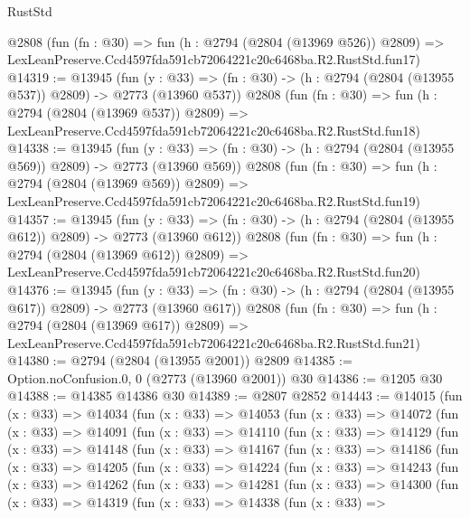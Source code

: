\begin{lexlean}{RustStd}
\begin{coremodule}
    @2808
    (fun (fn : @30) =>
    fun (h : @2794 (@2804 (@13969 @526)) @2809) =>
    LexLeanPreserve.Ccd4597fda591cb72064221c20c6468ba.R2.RustStd.fun17)
@14319 := @13945
    (fun (y : @33) => (fn : @30) -> (h : @2794 (@2804 (@13955 @537)) @2809) -> @2773 (@13960 @537))
    @2808
    (fun (fn : @30) =>
    fun (h : @2794 (@2804 (@13969 @537)) @2809) =>
    LexLeanPreserve.Ccd4597fda591cb72064221c20c6468ba.R2.RustStd.fun18)
@14338 := @13945
    (fun (y : @33) => (fn : @30) -> (h : @2794 (@2804 (@13955 @569)) @2809) -> @2773 (@13960 @569))
    @2808
    (fun (fn : @30) =>
    fun (h : @2794 (@2804 (@13969 @569)) @2809) =>
    LexLeanPreserve.Ccd4597fda591cb72064221c20c6468ba.R2.RustStd.fun19)
@14357 := @13945
    (fun (y : @33) => (fn : @30) -> (h : @2794 (@2804 (@13955 @612)) @2809) -> @2773 (@13960 @612))
    @2808
    (fun (fn : @30) =>
    fun (h : @2794 (@2804 (@13969 @612)) @2809) =>
    LexLeanPreserve.Ccd4597fda591cb72064221c20c6468ba.R2.RustStd.fun20)
@14376 := @13945
    (fun (y : @33) => (fn : @30) -> (h : @2794 (@2804 (@13955 @617)) @2809) -> @2773 (@13960 @617))
    @2808
    (fun (fn : @30) =>
    fun (h : @2794 (@2804 (@13969 @617)) @2809) =>
    LexLeanPreserve.Ccd4597fda591cb72064221c20c6468ba.R2.RustStd.fun21)
@14380 := @2794 (@2804 (@13955 @2001)) @2809
@14385 := Option.noConfusion.{0, 0} (@2773 (@13960 @2001)) @30
@14386 := @1205 @30
@14388 := @14385 @14386 @30
@14389 := @2807 @2852
@14443 := @14015
    (fun (x : @33) =>
    @14034
      (fun (x : @33) =>
      @14053
        (fun (x : @33) =>
        @14072
          (fun (x : @33) =>
          @14091
            (fun (x : @33) =>
            @14110
              (fun (x : @33) =>
              @14129
                (fun (x : @33) =>
                @14148
                  (fun (x : @33) =>
                  @14167
                    (fun (x : @33) =>
                    @14186
                      (fun (x : @33) =>
                      @14205
                        (fun (x : @33) =>
                        @14224
                          (fun (x : @33) =>
                          @14243
                            (fun (x : @33) =>
                            @14262
                              (fun (x : @33) =>
                              @14281
                                (fun (x : @33) =>
                                @14300
                                  (fun (x : @33) =>
                                  @14319
                                    (fun (x : @33) =>
                                    @14338
                                      (fun (x : @33) =>

\end{coremodule}
\end{lexlean}
